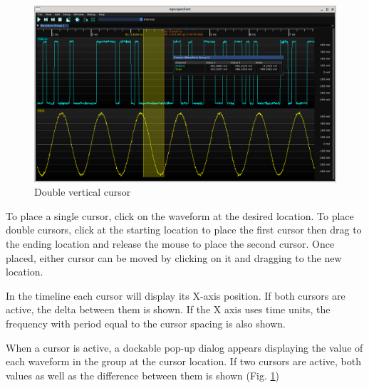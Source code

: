 \begin{figure}[H]
\centering
\includegraphics[width=13cm]{ng-images/vertical-cursor-x2.png}
\caption{Double vertical cursor}
\label{vertical-cursor-x2}
\end{figure}

To place a single cursor, click on the waveform at the desired location. To place double cursors, click at the starting
location to place the first cursor then drag to the ending location and release the mouse to place the second cursor.
Once placed, either cursor can be moved by clicking on it and dragging to the new location.


In the timeline each cursor will display its X-axis position. If both cursors are active, the delta between them
is shown. If the X axis uses time units, the frequency with period equal to the cursor spacing is also shown.

When a cursor is active, a dockable pop-up dialog appears displaying the value of each waveform in the group at the
cursor location. If two cursors are active, both values as well as the difference between them is shown (Fig.
\ref{vertical-cursor-x2})

